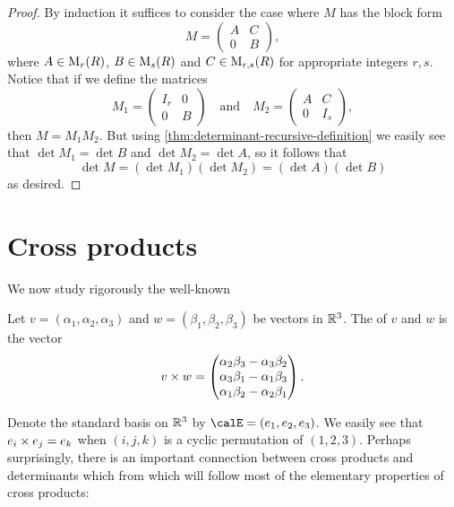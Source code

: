 \begin{proof}
    By induction it suffices to consider the case where $M$ has the block form
    \begin{equation*}
        M
            = \begin{pmatrix}
                A & C \\
                0 & B
            \end{pmatrix},
    \end{equation*}
    where $A \in \mathrm{M}_{r}(R)$, $B \in \mathrm{M}_{s}(R)$ and $C \in \mathrm{M}_{r,s}(R)$ for appropriate integers $r,s$. Notice that if we define the matrices
    \begin{equation*}
        M_1
            = \begin{pmatrix}
                I_r & 0 \\
                0   & B
            \end{pmatrix}
        \quad \text{and} \quad
        M_2
            = \begin{pmatrix}
                A & C   \\
                0 & I_s
            \end{pmatrix},
    \end{equation*}
    then $M = M_1 M_2$. But using \cref{thm:determinant-recursive-definition} we easily see that $\det M_1 = \det B$ and $\det M_2 = \det A$, so it follows that
    \begin{equation*}
        \det M
            = (\det M_1) (\det M_2)
            = (\det A) (\det B)
    \end{equation*}
    as desired.
\end{proof}


\section{Cross products}

We now study rigorously the well-known

\begin{definition}
    Let $v = (\alpha_1, \alpha_2, \alpha_3)$ and $w = (\beta_1, \beta_2, \beta_3)$ be vectors in $\mathbb{R}^3$. The  of $v$ and $w$ is the vector
    \begin{equation*}
        v \times w =
        \begin{pmatrix}
            \alpha_2 \beta_3 - \alpha_3 \beta_2 \\
            \alpha_3 \beta_1 - \alpha_1 \beta_3 \\
            \alpha_1 \beta_2 - \alpha_2 \beta_1
        \end{pmatrix}.
    \end{equation*}
\end{definition}
%
Denote the standard basis on $\mathbb{R}^3$ by $\calE = (e_1, e_2, e_3)$. We easily see that $e_i \times e_j = e_k$ when $(i,j,k)$ is a cyclic permutation of $(1,2,3)$. Perhaps surprisingly, there is an important connection between cross products and determinants which from which will follow most of the elementary properties of cross products:


